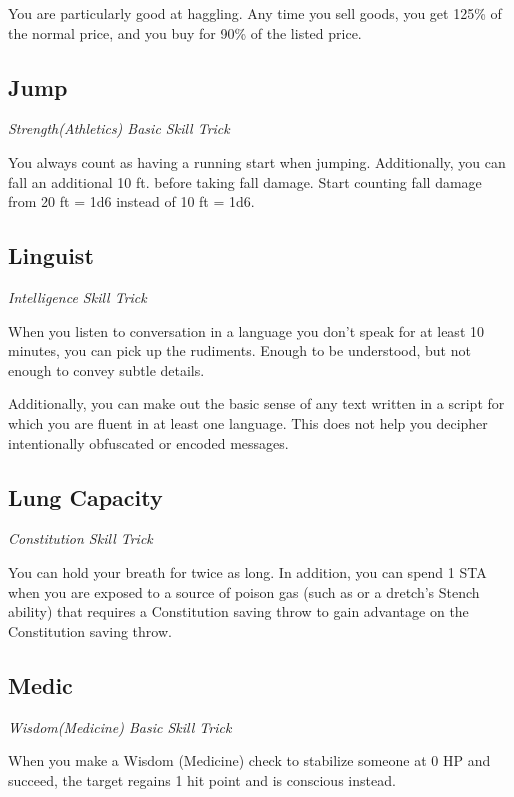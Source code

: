 You are particularly good at haggling. Any time you sell goods, you get 125\% of the normal price, and you buy for 90\% of the listed price.

\subsection{Jump}

\textit{Strength(Athletics) Basic Skill Trick}

You always count as having a running start when jumping. Additionally, you can fall an additional 10 ft. before taking fall damage. Start counting fall damage from 20 ft = 1d6 instead of 10 ft = 1d6.

\subsection{Linguist}\label{st:linguist}

\textit{Intelligence Skill Trick}

When you listen to conversation in a language you don't speak for at least 10 minutes, you can pick up the rudiments. Enough to be understood, but not enough to convey subtle details.

Additionally, you can make out the basic sense of any text written in a script for which you are fluent in at least one language. This does not help you decipher intentionally obfuscated or encoded messages.

\subsection{Lung Capacity}\label{st:lung-capacity}

\textit{Constitution Skill Trick}

You can hold your breath for twice as long. In addition, you can spend 1 STA when you are exposed to a source of poison gas (such as  or a dretch's Stench ability) that requires a Constitution saving throw to gain advantage on the Constitution saving throw. 

\subsection{Medic}\label{st:medic}

\textit{Wisdom(Medicine) Basic Skill Trick}

When you make a Wisdom (Medicine) check to stabilize someone at 0 HP and succeed, the target regains 1 hit point and is conscious instead.

